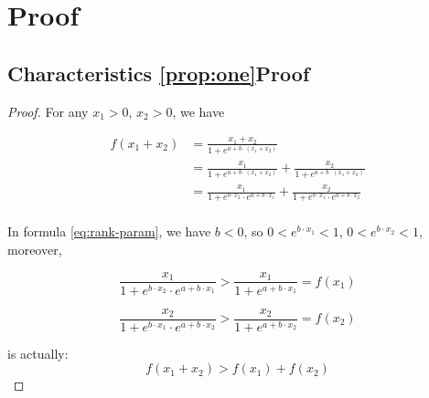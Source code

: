 \section{Proof}
\label{sec:appendix_proof}
\subsection{Characteristics \ref{prop:one}Proof}
\begin{proof}
\label{proof:one}
For any $x_1>0$, $x_2>0$, we have

\[
\begin{aligned}
f(x_1+x_2)&=\frac{x_1+x_2}{1+e^{a+b\cdot (x_1+x_2)}}\\
&=\frac{x_1}{1+e^{a+b\cdot (x_1+x_2)}}+\frac{x_2}{1+e^{a+b\cdot (x_1+x_2)}}\\
&=\frac{x_1}{1+e^{b\cdot x_2}\cdot e^{a+b\cdot {x_1}}}+\frac{x_2}{1+e^{b\cdot x_1}\cdot e^{a+b\cdot {x_2}}}\\
\end{aligned}
\]

In formula \ref{eq:rank-param}, we have $b<0$, so $0<e^{b\cdot x_1}<1$, $0<e^{b\cdot x_2}<1$, moreover,

\[
\frac{x_1}{1+e^{b\cdot x_2}\cdot e^{a+b\cdot {x_1}}}>\frac{x_1}{1+ e^{a+b\cdot {x_1}}}=f(x_1)
\]

\[
\frac{x_2}{1+e^{b\cdot x_1}\cdot e^{a+b\cdot {x_2}}}>\frac{x_2}{1+ e^{a+b\cdot {x_2}}}=f(x_2)
\]

is actually:
\[
f(x_1+x_2)>f(x_1)+f(x_2)
\]
\end{proof}

